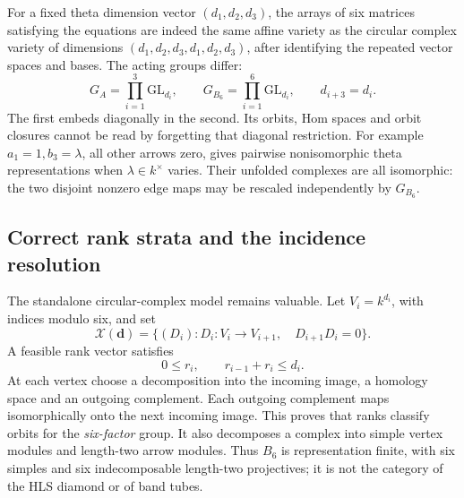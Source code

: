 For a fixed theta dimension vector $(d_1,d_2,d_3)$, the arrays of six matrices
satisfying the equations are indeed the same affine variety as the circular
complex variety of dimensions $(d_1,d_2,d_3,d_1,d_2,d_3)$, after identifying the
repeated vector spaces and bases. The acting groups differ:
\[
 G_A=\prod_{i=1}^3\mathrm{GL}_{d_i},\qquad
 G_{B_6}=\prod_{i=1}^6\mathrm{GL}_{d_i},\qquad d_{i+3}=d_i.
\]
The first embeds diagonally in the second. Its orbits, Hom spaces and orbit
closures cannot be read by forgetting that diagonal restriction.
For example $a_1=1,b_3=\lambda$, all other arrows zero, gives pairwise
nonisomorphic theta representations when $\lambda\in k^\times$ varies.
Their unfolded complexes are all isomorphic: the two disjoint nonzero edge
maps may be rescaled independently by $G_{B_6}$.

\subsection{Correct rank strata and the incidence resolution}
The standalone circular-complex model remains valuable. Let $V_i=k^{d_i}$,
with indices modulo six, and set
\[
 \mathcal X(\mathbf d)=\{(D_i):D_i:V_i\to V_{i+1},\quad D_{i+1}D_i=0\}.
\]
A feasible rank vector satisfies
\[
 0\le r_i,\qquad r_{i-1}+r_i\le d_i.
\]
At each vertex choose a decomposition into the incoming image, a homology
space and an outgoing complement. Each outgoing complement maps isomorphically
onto the next incoming image. This proves that ranks classify orbits for the
\emph{six-factor} group. It also decomposes a complex into simple vertex modules
and length-two arrow modules. Thus $B_6$ is representation finite, with six
simples and six indecomposable length-two projectives; it is not the category
of the HLS diamond or of band tubes.

